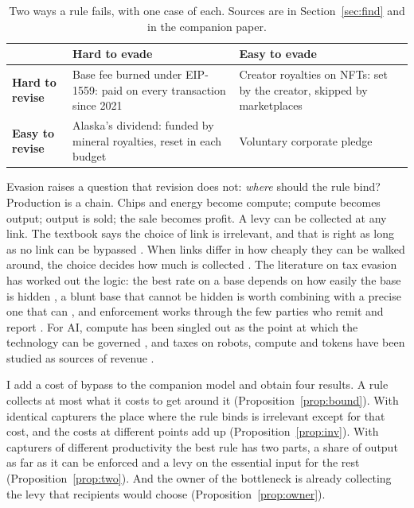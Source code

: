 \begin{table}[b]
\centering
\caption{Two ways a rule fails, with one case of each. Sources are in
Section~\ref{sec:find} and in the companion paper.}
\label{tab:twobytwo}
\small
\renewcommand{\arraystretch}{1.25}
\begin{tabular}{@{}>{\raggedright\arraybackslash}p{}>{\raggedright\arraybackslash}p{}>{\raggedright\arraybackslash}p{}@{}}
\toprule
 & \textbf{Hard to evade} & \textbf{Easy to evade}\\
\midrule
\textbf{Hard to revise} & Base fee burned under EIP-1559: paid on every transaction
since 2021 & Creator royalties on NFTs: set by the creator, skipped by marketplaces\\
\textbf{Easy to revise} & Alaska's dividend: funded by mineral royalties, reset in each
budget & Voluntary corporate pledge\\
\bottomrule
\end{tabular}
\end{table}

Evasion raises a question that revision does not: \emph{where} should the rule bind?
Production is a chain. Chips and energy become compute; compute becomes output; output is
sold; the sale becomes profit. A levy can be collected at any link. The textbook says the
choice of link is irrelevant, and that is right as long as no link can be bypassed
\citep{Slemrod2008}. When links differ in how cheaply they can be walked around, the
choice decides how much is collected \citep{KopczukEtAl2016}. The literature on tax
evasion has worked out the logic: the best rate on a base depends on how easily the base
is hidden \citep{CremerGahvari1993}, a blunt base that cannot be hidden is worth combining
with a precise one that can \citep{BoadwayMarchandPestieau1994,BestEtAl2015}, and
enforcement works through the few parties who remit and report
\citep{KopczukSlemrod2006,KlevenKreinerSaez2016}. For AI, compute has been singled out as
the point at which the technology can be governed \citep{SastryEtAl2024}, and taxes on
robots, compute and tokens have been studied as sources of revenue
\citep{GuerreiroRebeloTeles2022,KorinekLockwood2026}.

I add a cost of bypass to the companion model and obtain four results. A rule collects at
most what it costs to get around it (Proposition~\ref{prop:bound}). With identical
capturers the place where the rule binds is irrelevant except for that cost, and the
costs at different points add up (Proposition~\ref{prop:inv}). With capturers of
different productivity the best rule has two parts, a share of output as far as it can be
enforced and a levy on the essential input for the rest
(Proposition~\ref{prop:two}). And the owner of the bottleneck is already collecting the
levy that recipients would choose (Proposition~\ref{prop:owner}).

